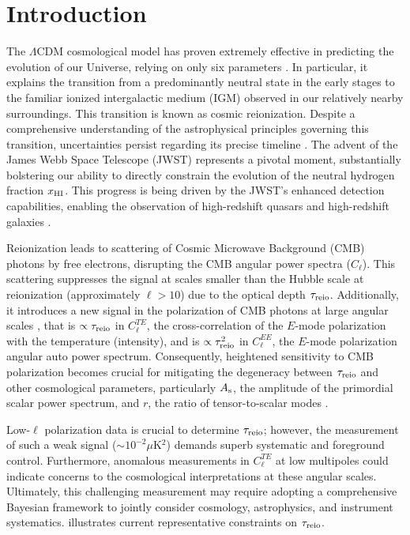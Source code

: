 \section*{Introduction}


The $\Lambda$CDM cosmological model has proven extremely effective in
predicting the evolution of our Universe, relying on only six parameters
\cite{Planck2020a}.
In particular, it explains the transition from a predominantly neutral
state in the early stages to the familiar ionized intergalactic medium
(IGM) observed in our relatively nearby surroundings.
This transition is known as cosmic reionization.
Despite a comprehensive understanding of the astrophysical principles
governing this transition, uncertainties persist regarding its precise
timeline \cite{Jin2023}.
The advent of the James Webb Space Telescope (JWST) \cite{Gardner2006}
represents a pivotal moment, substantially bolstering our ability to
directly constrain the evolution of the neutral hydrogen fraction
$x_{\mathrm{HI}}$.
This progress is being driven by the JWST's enhanced detection
capabilities, enabling the observation of high-redshift quasars
\cite{Eilers2023} and high-redshift galaxies
\cite{Adams2023, Bradley2023, Donnan2023}.

Reionization leads to scattering of Cosmic Microwave Background (CMB)
photons by free electrons, disrupting the CMB angular power spectra
($C_\ell$).
This scattering suppresses the signal at scales smaller than the Hubble
scale at reionization (approximately $\ell>10$) \cite{Planck2020b} due
to the optical depth $\tau_{\mathrm{reio}}$.
Additionally, it introduces a new signal in the polarization of CMB
photons at large angular scales \cite{Planck2020a}, that is $\propto
\tau_{\mathrm{reio}}$ in $C^{TE}_\ell$, the cross-correlation of the $E$-mode
polarization with the temperature (intensity), and is $\propto
\tau_{\mathrm{reio}}^2$ in $C^{EE}_\ell$, the $E$-mode polarization angular auto
power spectrum.
Consequently, heightened sensitivity to CMB polarization becomes crucial
for mitigating the degeneracy between $\tau_{\mathrm{reio}}$ and other
cosmological parameters, particularly $A_\mathrm{s}$, the amplitude of the
primordial scalar power spectrum, and $r$, the ratio of tensor-to-scalar
modes \cite{Natale2020}.

Low-$\ell$ polarization data is crucial to determine $\tau_{\mathrm{reio}}$; however, 
the measurement of such a weak signal ($ \sim 10^{-2} \mu$K$^2$) demands 
superb systematic and foreground control\cite{Planck2020b}. Furthermore, 
anomalous measurements in $C^{TE}_\ell$ at low multipoles\cite{Planck2020a}
could indicate concerns to the cosmological interpretations at these angular scales. 
Ultimately, this challenging measurement may require adopting a comprehensive 
Bayesian framework to jointly consider cosmology, astrophysics, and
instrument systematics\cite{Paradiso2023}.  illustrates current 
representative constraints on $\tau_{\mathrm{reio}}$.

